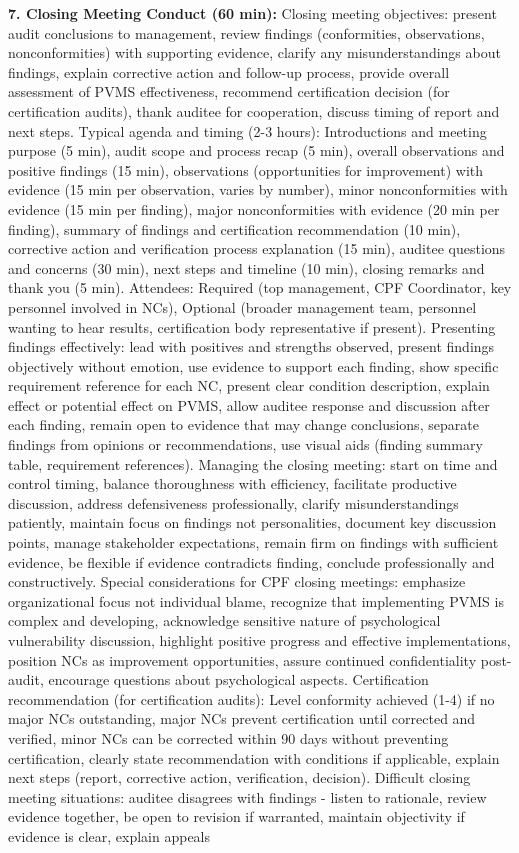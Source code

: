 \documentclass[11pt,a4paper]{article}
\begin{document}
\textbf{7. Closing Meeting Conduct (60 min):} Closing meeting objectives: present audit conclusions to management, review findings (conformities, observations, nonconformities) with supporting evidence, clarify any misunderstandings about findings, explain corrective action and follow-up process, provide overall assessment of PVMS effectiveness, recommend certification decision (for certification audits), thank auditee for cooperation, discuss timing of report and next steps. Typical agenda and timing (2-3 hours): Introductions and meeting purpose (5 min), audit scope and process recap (5 min), overall observations and positive findings (15 min), observations (opportunities for improvement) with evidence (15 min per observation, varies by number), minor nonconformities with evidence (15 min per finding), major nonconformities with evidence (20 min per finding), summary of findings and certification recommendation (10 min), corrective action and verification process explanation (15 min), auditee questions and concerns (30 min), next steps and timeline (10 min), closing remarks and thank you (5 min). Attendees: Required (top management, CPF Coordinator, key personnel involved in NCs), Optional (broader management team, personnel wanting to hear results, certification body representative if present). Presenting findings effectively: lead with positives and strengths observed, present findings objectively without emotion, use evidence to support each finding, show specific requirement reference for each NC, present clear condition description, explain effect or potential effect on PVMS, allow auditee response and discussion after each finding, remain open to evidence that may change conclusions, separate findings from opinions or recommendations, use visual aids (finding summary table, requirement references). Managing the closing meeting: start on time and control timing, balance thoroughness with efficiency, facilitate productive discussion, address defensiveness professionally, clarify misunderstandings patiently, maintain focus on findings not personalities, document key discussion points, manage stakeholder expectations, remain firm on findings with sufficient evidence, be flexible if evidence contradicts finding, conclude professionally and constructively. Special considerations for CPF closing meetings: emphasize organizational focus not individual blame, recognize that implementing PVMS is complex and developing, acknowledge sensitive nature of psychological vulnerability discussion, highlight positive progress and effective implementations, position NCs as improvement opportunities, assure continued confidentiality post-audit, encourage questions about psychological aspects. Certification recommendation (for certification audits): Level conformity achieved (1-4) if no major NCs outstanding, major NCs prevent certification until corrected and verified, minor NCs can be corrected within 90 days without preventing certification, clearly state recommendation with conditions if applicable, explain next steps (report, corrective action, verification, decision). Difficult closing meeting situations: auditee disagrees with findings - listen to rationale, review evidence together, be open to revision if warranted, maintain objectivity if evidence is clear, explain appeals 
\end{document}
